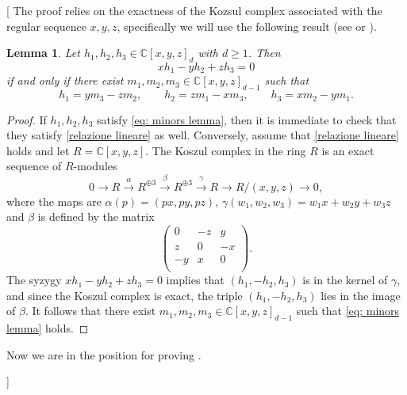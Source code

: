 \documentclass{amsart}
\theoremstyle{plain}
\newtheorem{lemma}{Lemma}[section]
\theoremstyle{definition}
\newcommand{\C}{\mathbb{C}}
\newcommand{\blue}[1]{{\color{blue}  [#1]}}
\begin{document}
\blue{
The proof relies on the exactness of the Kozsul complex associated with the regular sequence $x,y,z$, specifically we will use the following result (see \cite[Theorem 7.3.13]{Dolgachev} or \cite[Lemma 3.9]{BGV}).



\begin{lemma}\label{lem: Kozsul}
Let $h_1,h_2,h_3\in\C[x,y,z]_d$ with $d \ge 1$. Then 
\begin{equation}\label{relazione lineare}
xh_1-yh_2+zh_3=0
\end{equation}
 if and only if there exist $m_1,m_2,m_3\in\C[x,y,z]_{d-1}$ such that
\begin{equation}\label{eq: minors lemma}
    h_1 = ym_3-zm_2,\qquad h_2 = zm_1-xm_3,\qquad 
    h_3 = xm_2-ym_1.
\end{equation}

\end{lemma}

\begin{proof}
If $h_1,h_2,h_3$ satisfy \eqref{eq: minors lemma}, then it is immediate to check that they satisfy \eqref{relazione lineare} as well. Conversely, assume that \eqref{relazione lineare} holds and let $R = \C[x,y,z]$.
The Koszul complex in the ring
$R$ is an exact sequence of $R$-modules
$$
0\to R\xrightarrow{\alpha} R^{\oplus 3} \xrightarrow{\beta} R^{\oplus 3} \xrightarrow{\gamma} R \to R/(x,y,z)
\to 0,
$$
where the maps are $\alpha(p)=(p x,p y,p z)$, $\gamma (w_1,w_2,w_3)=w_1 x + w_2 y + w_3 z$ and $\beta$ is defined by the matrix
$$
\left(
\begin{array}{ccc}
0 & -z & y\\
z & 0 & -x\\
-y & x & 0 \\
\end{array}
\right).
$$
The syzygy $xh_1-yh_2+zh_3=0$ implies that $(h_1, -h_2, h_3)$ is in the kernel of $\gamma$, and since the Koszul complex is exact, the triple $(h_1,-h_2, h_3)$ lies in the image of $\beta$. It follows that there exist $m_1,m_2,m_3\in\C[x,y,z]_{d-1}$ such that \eqref{eq: minors lemma} holds.
\end{proof}

Now we are in the position for proving \Cref{p2}.


}
\end{document}
